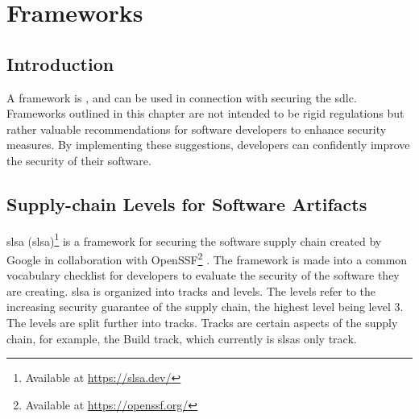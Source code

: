 \newpage
\section{Frameworks}
\subsection{Introduction}
A framework is \textit{} \cite{FrameworkDefinition}, and can be used in connection with securing the \acrshort{sdlc}. Frameworks outlined in this chapter are not intended to be rigid regulations but rather valuable recommendations for software developers to enhance security measures. By implementing these suggestions, developers can confidently improve the security of their software.

\subsection{Supply-chain Levels for Software Artifacts}
\acrlong{slsa} (\acrshort{slsa})\footnote{Available at \url{https://slsa.dev/}} is a framework for securing the software supply chain created by Google in collaboration with OpenSSF\footnote{Available at \url{https://openssf.org/}} \cite{SLSAgeneral}. The framework is made into a common vocabulary checklist for developers to evaluate the security of the software they are creating. \acrshort{slsa} is organized into tracks and levels. The levels refer to the increasing security guarantee of the supply chain, the highest level being level 3. The levels are split further into tracks. Tracks are certain aspects of the supply chain, for example, the Build track, which currently is \acrshort{slsa}s only track. 

